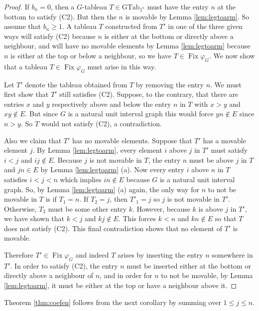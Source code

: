 \documentclass[12pt]{amsart}  %
\theoremstyle{definition}
\theoremstyle{remark}
\numberwithin{equation}{section}
\DeclareMathOperator{\Fix}{Fix}
\begin{document}
\begin{proof}
If $b_n=0$, then a $G$-tableau $T\in\text{GTab}_{1^n}$ must have the entry $n$ at the bottom to satisfy (C2).
But then the $n$ is movable by Lemma \ref{lem:legtoarm}. So assume that $b_n\geq 1$. A tableau $T$ constructed from $T'$ in one of the three given ways will satisfy (C2) because $n$ is either at the bottom or directly above a neighbour, and will have no movable elements by Lemma \ref{lem:legtoarm} because $n$ is either at the top or below a neighbour, so we have $T\in\Fix\varphi_G$. We now show that a tableau $T\in\Fix\varphi_G$ must arise in this way. 

Let $T'$ denote the tableau obtained from $T$ by removing the entry $n$. 
We must first show that $T'$ still satisfies (C2).  Suppose, to the contrary, that 
there are entries $x$ and $y$ respectively above and below the entry $n$ in $T$ with $x>y$ and $xy\notin E$. But since  $G$ is a natural unit interval graph this would force $yn\notin E$ since $n>y$.  So $T$ would not satisfy (C2), a contradiction.

Also we claim that  $T'$ has no movable elements. Suppose that $T'$ has a movable element  $j$. By Lemma \ref{lem:legtoarm}, every element $i$ above $j$ in $T'$ must satisfy $i<j$ and $ij\notin E$. Because $j$ is not movable in $T$, the entry $n$ must be above $j$ in $T$ and $jn\in E$ by Lemma \ref{lem:legtoarm} (a). Now every entry $i$ above $n$ in $T$ satisfies $i<j<n$ which implies $in\notin E$ because $G$ is a natural unit interval graph. 
So, by Lemma \ref{lem:legtoarm} (a) again, the only way for $n$ to not be movable in $T$ is if 
$T_1=n$. If $T_2=j$, then $T'_1=j$ so $j$ is not movable in $T'$.  Otherwise, $T_2$ must be some other entry $k$. However, because $k$ is above $j$ in $T'$, we have shown that $k<j$ and $kj\notin E$. 
This  forces $k<n$ and $kn\notin E$ so that $T$ does not satisfy (C2). 
 This final contradiction shows that no element of $T'$ is movable.


Therefore $T'\in\Fix\varphi_G$ and indeed $T$ arises by inserting the entry $n$ somewhere in $T'$. In order to satisfy (C2), the entry $n$ must be inserted either at the bottom or directly above a neighbour of $n$, and in order for $n$ to not be movable, by Lemma \ref{lem:legtoarm}, it must be either at the top or have a neighbour above it.
\end{proof}

Theorem \ref{thm:coefen} follows from the next corollary by summing over $1\leq j\leq n$.
\end{document}
